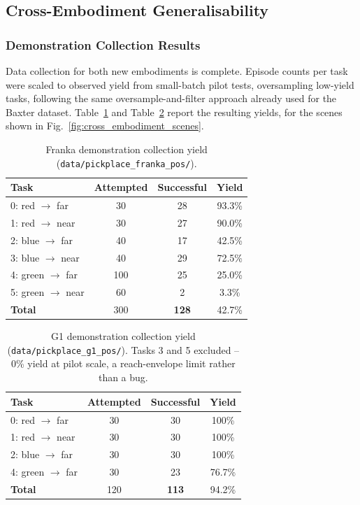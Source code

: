 \documentclass[12pt]{article}
\begin{document}
\subsection{Cross-Embodiment Generalisability}
\label{sec:results-crossemb}

\subsubsection{Demonstration Collection Results}
Data collection for both new embodiments is complete. Episode counts per task were scaled to observed yield from small-batch pilot tests, oversampling low-yield tasks, following the same oversample-and-filter approach already used for the Baxter dataset. Table~\ref{tab:franka_yield} and Table~\ref{tab:g1_yield} report the resulting yields, for the scenes shown in Fig.~\ref{fig:cross_embodiment_scenes}.

\begin{table}[H]
\centering
\caption{Franka demonstration collection yield (\texttt{data/pickplace\_franka\_pos/}).}
\label{tab:franka_yield}
\begin{tabular}{lccc}
\toprule
\textbf{Task} & \textbf{Attempted} & \textbf{Successful} & \textbf{Yield} \\
\midrule
0: red $\to$ far & 30 & 28 & 93.3\% \\
1: red $\to$ near & 30 & 27 & 90.0\% \\
2: blue $\to$ far & 40 & 17 & 42.5\% \\
3: blue $\to$ near & 40 & 29 & 72.5\% \\
4: green $\to$ far & 100 & 25 & 25.0\% \\
5: green $\to$ near & 60 & 2 & 3.3\% \\
\midrule
\textbf{Total} & 300 & \textbf{128} & 42.7\% \\
\bottomrule
\end{tabular}
\end{table}

\begin{table}[H]
\centering
\caption{G1 demonstration collection yield (\texttt{data/pickplace\_g1\_pos/}). Tasks 3 and 5 excluded -- 0\% yield at pilot scale, a reach-envelope limit rather than a bug.}
\label{tab:g1_yield}
\begin{tabular}{lccc}
\toprule
\textbf{Task} & \textbf{Attempted} & \textbf{Successful} & \textbf{Yield} \\
\midrule
0: red $\to$ far & 30 & 30 & 100\% \\
1: red $\to$ near & 30 & 30 & 100\% \\
2: blue $\to$ far & 30 & 30 & 100\% \\
4: green $\to$ far & 30 & 23 & 76.7\% \\
\midrule
\textbf{Total} & 120 & \textbf{113} & 94.2\% \\
\bottomrule
\end{tabular}
\end{table}
\end{document}
